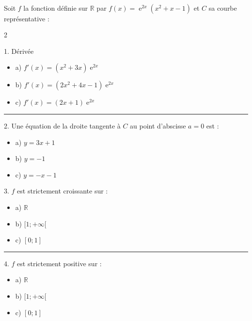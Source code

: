 \documentclass[11pt,a4paper]{article}
\DeclareMathOperator{\e}{e}
\begin{document}
\\[5 pt]
Soit $f$ la fonction définie sur $\mathbb{R}$ par $f(x)=\e^{2x}(x^2+x-1)$ et $C$ sa courbe représentative : \\
\begin{multicols}{2}

1. Dérivée 
\begin{itemize}[label=$\square$]
\item   a) $f'(x)=(x^2+3x)\e^{2x}$
\item   b) $f'(x)=(2x^2+4x-1)\e^{2x}$
\item   c) $f'(x)=(2x+1)\e^{2x}$
\end{itemize}
\begin{center}
\noindent\rule{5cm}{0.4pt}
\end{center}


2. Une équation de la droite tangente à $C$ au point d'abscisse $a=0$ est :
\begin{itemize}[label=$\square$]
\item   a) $y=3x+1$
\item   b) $y=-1$
\item   c) $y=-x-1$
\end{itemize}


3. $f$ est strictement croissante sur :
\begin{itemize}[label=$\square$]
\item   a) $\mathbb{R}$
\item   b) $[1;+\infty[$
\item   c) $[0;1]$
\end{itemize}

\begin{center}
\noindent\rule{5cm}{0.4pt}
\end{center}

4. $f$ est strictement positive sur :  
\begin{itemize}[label=$\square$]
\item   a) $\mathbb{R}$
\item   b) $[1;+\infty[$
\item   c) $[0;1]$
\end{itemize}

\end{multicols}

\vfill 

\newpage 


\\
\normalsize
\end{document}
